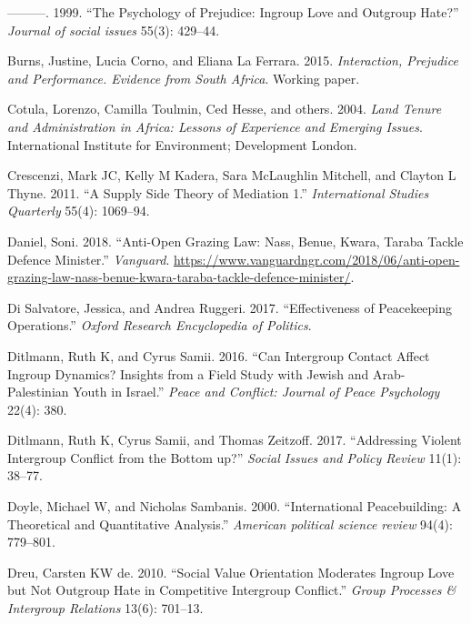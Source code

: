\documentclass[11pt]{article}
\begin{document}
\leavevmode\hypertarget{ref-brewer1999ingroupOutgroup}{}%
---------. 1999. ``The Psychology of Prejudice: Ingroup Love and
Outgroup Hate?'' \emph{Journal of social issues} 55(3): 429--44.

\leavevmode\hypertarget{ref-burns2015interaction}{}%
Burns, Justine, Lucia Corno, and Eliana La Ferrara. 2015.
\emph{Interaction, Prejudice and Performance. Evidence from South
Africa}. Working paper.

\leavevmode\hypertarget{ref-cotula2004land}{}%
Cotula, Lorenzo, Camilla Toulmin, Ced Hesse, and others. 2004.
\emph{Land Tenure and Administration in Africa: Lessons of Experience
and Emerging Issues}. International Institute for Environment;
Development London.

\leavevmode\hypertarget{ref-crescenzi2011supply}{}%
Crescenzi, Mark JC, Kelly M Kadera, Sara McLaughlin Mitchell, and
Clayton L Thyne. 2011. ``A Supply Side Theory of Mediation 1.''
\emph{International Studies Quarterly} 55(4): 1069--94.

\leavevmode\hypertarget{ref-daniel2018anti}{}%
Daniel, Soni. 2018. ``Anti-Open Grazing Law: Nass, Benue, Kwara, Taraba
Tackle Defence Minister.'' \emph{Vanguard}.
\url{https://www.vanguardngr.com/2018/06/anti-open-grazing-law-nass-benue-kwara-taraba-tackle-defence-minister/}.

\leavevmode\hypertarget{ref-di2017effectiveness}{}%
Di Salvatore, Jessica, and Andrea Ruggeri. 2017. ``Effectiveness of
Peacekeeping Operations.'' \emph{Oxford Research Encyclopedia of
Politics}.

\leavevmode\hypertarget{ref-ditlmann2016can}{}%
Ditlmann, Ruth K, and Cyrus Samii. 2016. ``Can Intergroup Contact Affect
Ingroup Dynamics? Insights from a Field Study with Jewish and
Arab-Palestinian Youth in Israel.'' \emph{Peace and Conflict: Journal of
Peace Psychology} 22(4): 380.

\leavevmode\hypertarget{ref-ditlmann2017addressing}{}%
Ditlmann, Ruth K, Cyrus Samii, and Thomas Zeitzoff. 2017. ``Addressing
Violent Intergroup Conflict from the Bottom up?'' \emph{Social Issues
and Policy Review} 11(1): 38--77.

\leavevmode\hypertarget{ref-doyle2000international}{}%
Doyle, Michael W, and Nicholas Sambanis. 2000. ``International
Peacebuilding: A Theoretical and Quantitative Analysis.'' \emph{American
political science review} 94(4): 779--801.

\leavevmode\hypertarget{ref-dreu2010social}{}%
Dreu, Carsten KW de. 2010. ``Social Value Orientation Moderates Ingroup
Love but Not Outgroup Hate in Competitive Intergroup Conflict.''
\emph{Group Processes \& Intergroup Relations} 13(6): 701--13.
\end{document}
